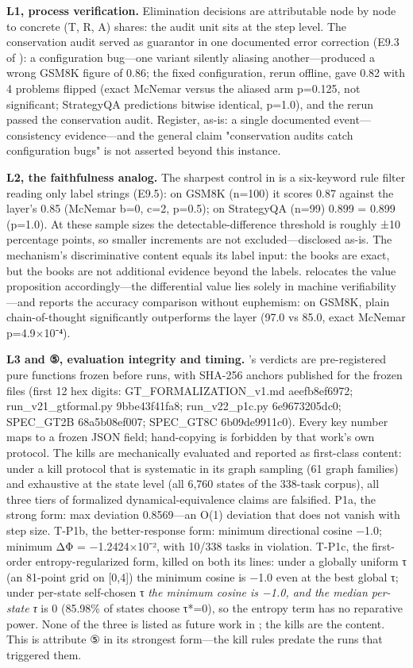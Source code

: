 \documentclass[11pt,a4paper]{article}
\begin{document}
\textbf{L1, process verification.} Elimination decisions are attributable node by node to concrete (T, R, A) shares: the audit unit sits at the step level. The conservation audit served as guarantor in one documented error correction (E9.3 of \cite{key04}): a configuration bug—one variant silently aliasing another—produced a wrong GSM8K figure of 0.86; the fixed configuration, rerun offline, gave 0.82 with 4 problems flipped (exact McNemar versus the aliased arm p=0.125, not significant; StrategyQA predictions bitwise identical, p=1.0), and the rerun passed the conservation audit. Register, as-is: a single documented event—consistency evidence—and the general claim "conservation audits catch configuration bugs" is not asserted beyond this instance.

\textbf{L2, the faithfulness analog.} The sharpest control in \cite{key04} is a six-keyword rule filter reading only label strings (E9.5): on GSM8K (n=100) it scores 0.87 against the layer's 0.85 (McNemar b=0, c=2, p=0.5); on StrategyQA (n=99) 0.899 = 0.899 (p=1.0). At these sample sizes the detectable-difference threshold is roughly ±10 percentage points, so smaller increments are not excluded—disclosed as-is. The mechanism's discriminative content equals its label input: the books are exact, but the books are not additional evidence beyond the labels. \cite{key04} relocates the value proposition accordingly—the differential value lies solely in machine verifiability—and reports the accuracy comparison without euphemism: on GSM8K, plain chain-of-thought significantly outperforms the layer (97.0 vs 85.0, exact McNemar p=4.9×10⁻⁴).

\textbf{L3 and ⑤, evaluation integrity and timing.} \cite{key04}'s verdicts are pre-registered pure functions frozen before runs, with SHA-256 anchors published for the frozen files (first 12 hex digits: GT\_FORMALIZATION\_v1.md aeefb8ef6972; run\_v21\_gtformal.py 9bbe43f41fa8; run\_v22\_p1c.py 6e9673205dc0; SPEC\_GT2B 68a5b08ef007; SPEC\_GT8C 6b09de9911c0). Every key number maps to a frozen JSON field; hand-copying is forbidden by that work's own protocol. The kills are mechanically evaluated and reported as first-class content: under a kill protocol that is systematic in its graph sampling (61 graph families) and exhaustive at the state level (all 6,760 states of the 338-task corpus), all three tiers of formalized dynamical-equivalence claims are falsified. P1a, the strong form: max deviation 0.8569—an O(1) deviation that does not vanish with step size. T-P1b, the better-response form: minimum directional cosine −1.0; minimum ΔΦ = −1.2424×10⁻², with 10/338 tasks in violation. T-P1c, the first-order entropy-regularized form, killed on both its lines: under a globally uniform τ (an 81-point grid on [0,4]) the minimum cosine is −1.0 even at the best global τ; under per-state self-chosen τ\textit{ the minimum cosine is −1.0, and the median per-state τ} is 0 (85.98\% of states choose τ*=0), so the entropy term has no reparative power. None of the three is listed as future work in \cite{key04}; the kills are the content. This is attribute ⑤ in its strongest form—the kill rules predate the runs that triggered them.
\end{document}
